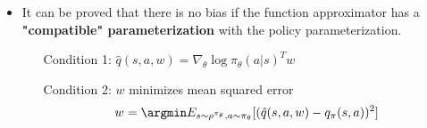 \documentclass[a4paper]{article}
\begin{document}
\begin{itemize}
    \item It can be proved that there is no bias if the function approximator has a \textbf{"compatible" parameterization} with the policy parameterization.
    \begin{enumerate}[leftmargin=3cm]
        \item[Condition 1:] $\hat{q}(s,a,w)=\nabla_\theta \log{\pi_\theta(a|s)^Tw}$
        \item[Condition 2:] $w$ minimizes mean squared error
        \begin{equation*}
            w=\argmin E_{s\sim \rho^{\pi_\theta},a\sim \pi_\theta}[(\hat{q}(s,a,w)-q_\pi(s,a))^2]
        \end{equation*}
    \end{enumerate}
\end{itemize}
\end{document}
